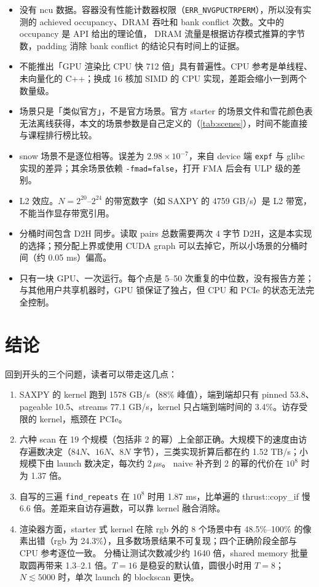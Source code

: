 \documentclass[11pt,a4paper]{ctexart}
\begin{document}
\begin{caveatbox}
\begin{itemize}
\item 没有 ncu 数据。容器没有性能计数器权限（\texttt{ERR\_NVGPUCTRPERM}），所以没有实测的 achieved occupancy、DRAM 吞吐和 bank conflict 次数。文中的 occupancy 是 API 给出的理论值，
DRAM 流量是根据访存模式推算的字节数，padding 消除 bank conflict 的结论只有时间上的证据。
\item 不能推出「GPU 渲染比 CPU 快 712 倍」具有普遍性。CPU 参考是单线程、未向量化的 C++；换成 16 核加 SIMD 的 CPU 实现，差距会缩小一到两个数量级。
\item 场景只是「类似官方」，不是官方场景。官方 starter 的场景文件和雪花颜色表无法离线获得，本文的场景参数是自己定义的（\cref{tab:scenes}），时间不能直接与课程排行榜比较。
\item snow 场景不是逐位相等。误差为 $2.98\times10^{-7}$，来自 device 端 \texttt{expf} 与 glibc 实现的差异；其余场景依赖 \texttt{-fmad=false}，打开 FMA 后会有 ULP 级的差别。
\item L2 效应。$N=2^{20}$–$2^{24}$ 的带宽数字（如 SAXPY 的 4759 GB/s）是 L2 带宽，不能当作显存带宽引用。
\item 分桶时间包含 D2H 同步。读取 pairs 总数需要两次 4 字节 D2H，这是本实现的选择；预分配上界或使用 CUDA graph 可以去掉它，所以小场景的分桶时间（约 0.05 ms）偏高。
\item 只有一块 GPU、一次运行。每个点是 5--50 次重复的中位数，没有报告方差；与其他用户共享机器时，GPU 锁保证了独占，但 CPU 和 PCIe 的状态无法完全控制。
\end{itemize}
\end{caveatbox}

\section{结论}

回到开头的三个问题，读者可以带走这几点：

\begin{enumerate}
\item SAXPY 的 kernel 跑到 1578 GB/s（88\% 峰值），端到端却只有 pinned 53.8、pageable 10.5、streams 77.1 GB/s，kernel 只占端到端时间的 3.4\%。访存受限的 kernel，瓶颈在 PCIe。
\item 六种 scan 在 19 个规模（包括非 2 的幂）上全部正确。大规模下的速度由访存遍数决定（$84N$、$16N$、$8N$ 字节），三类实现折算后都在约 1.52 TB/s；小规模下由 launch 数决定，每次约 2\,$\mu$s。
naive 补齐到 2 的幂的代价在 $10^8$ 时为 1.37 倍。
\item 自写的三遍 \texttt{find\_repeats} 在 $10^8$ 时用 1.87 ms，比单遍的 thrust::copy\_if 慢 6.6 倍。差距来自访存遍数，可以靠 kernel 融合消除。
\item 渲染器方面，starter 式 kernel 在除 rgb 外的 8 个场景中有 48.5\%--100\% 的像素出错（rgb 为 24.3\%），且多数场景结果不可复现；四个正确阶段全部与 CPU 参考逐位一致。
分桶让测试次数减少约 1640 倍，shared memory 批量取圆再带来 1.3--2.1 倍。$T=16$ 是稳妥的默认值，圆很小时用 $T=8$；$N\lesssim5000$ 时，单次 launch 的 blockscan 更快。
\end{enumerate}
\end{document}
